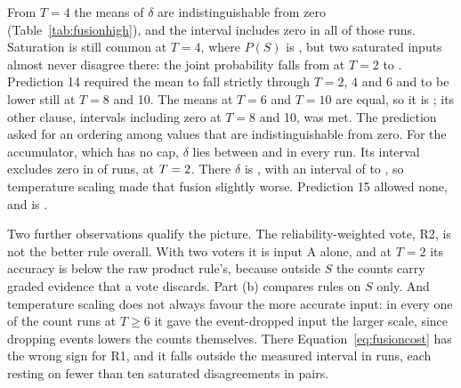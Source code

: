 From $T=4$ the means of $\delta$ are indistinguishable from zero (Table~\ref{tab:fusionhigh}), %
and the interval includes zero in all \fuHighRuns{} of those runs. %
Saturation is %
still common at $T=4$, where $P(S)$ is \fuCountFourPS, but two saturated inputs almost never %
disagree there: the joint probability falls from \fuTwoPSDisagree{} at $T=2$ to %
\fuFourPSDisagree. Prediction 14 required the mean to fall strictly through $T=2$, 4 and 6 and %
to be lower still at $T=8$ and 10. The means at $T=6$ and $T=10$ are equal, so it is
\verdictFourteen; its other clause, intervals including zero at $T=8$ and 10, was met. The %
prediction asked for an ordering among values that are indistinguishable from zero. For the
accumulator, which has no cap, $\delta$ lies between \fuAccumDeltaMin{} and \fuAccumDeltaMax{} %
in every run. Its interval excludes zero in \fuAccumExcl{} of \fuAccumRuns{} runs, at %
$T=2$. There $\delta$ is \fuAccumExclDelta, with an interval of \fuAccumExclLo{} to %
\fuAccumExclHi, so temperature scaling made that fusion slightly worse. Prediction 15 allowed none, and is
\verdictFifteen. %

Two further observations qualify the picture. The reliability-weighted vote, R2, is not the
better rule overall. With two voters it is input A alone, and at $T=2$ its accuracy is
\fuTwoRZeroMinusRTwo{} below the raw product rule's, because outside $S$ the counts carry graded %
evidence that a vote discards. Part (b) compares rules on $S$ only. And temperature scaling does
not always favour the more accurate input: in every one of the \fuLateRuns{} count %
runs at $T\ge6$ it gave the event-dropped input the larger scale, since dropping events lowers
the counts themselves. There Equation~\eqref{eq:fusioncost} has the wrong sign for R1, and it
falls outside the measured interval in \fuPredMissAll{} runs, each resting on fewer than ten %
saturated disagreements in \fuPairsPerRun{} pairs. %

